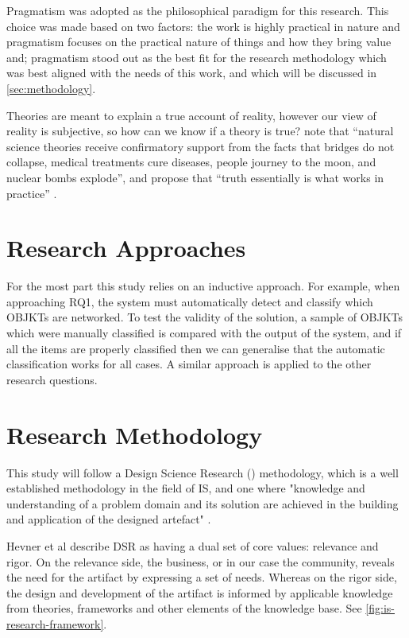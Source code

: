 Pragmatism was adopted as the philosophical paradigm for this research. This choice was made based on two factors: the work is highly practical in nature and pragmatism focuses on the practical nature of things and how they bring value and; pragmatism stood out as the best fit for the research methodology which was best aligned with the needs of this work, and which will be discussed in \autoref{sec:methodology}.

Theories are meant to explain a true account of reality, however our view of reality is subjective, so how can we know if a theory is true? \citeauthor{marchDesignNaturalScience1995} note that ``natural science theories receive confirmatory support from the facts that bridges do not collapse, medical treatments cure diseases, people journey to the moon, and nuclear bombs explode'', and propose that ``truth essentially is what works in practice'' \citeyear[p.255]{marchDesignNaturalScience1995}.


\section{Research Approaches}

For the most part this study relies on an inductive approach. For example, when approaching RQ1, the system must automatically detect and classify which OBJKTs are networked. To test the validity of the solution, a sample of OBJKTs which were manually classified is compared with the output of the system, and if all the items are properly classified then we can generalise that the automatic classification works for all cases.
A similar approach is applied to the other research questions.


\section{Research Methodology}
\label{sec:methodology}

This study will follow a Design Science Research () methodology, which is a well established methodology in the field of IS, and one where
"knowledge and understanding of a problem domain and its solution are achieved in the building and application of the designed artefact"  \cite[p.75]{hevnerDesignScienceInformation2004}.

Hevner et al \citeyear{hevnerDesignScienceInformation2004} describe DSR as having a dual set of core values: relevance and rigor. On the relevance side, the business, or in our case the community, reveals the need for the artifact by expressing a set of needs. Whereas on the rigor side, the design and development of the artifact is informed by applicable knowledge from theories, frameworks and other elements of the knowledge base. See \autoref{fig:is-research-framework}.

